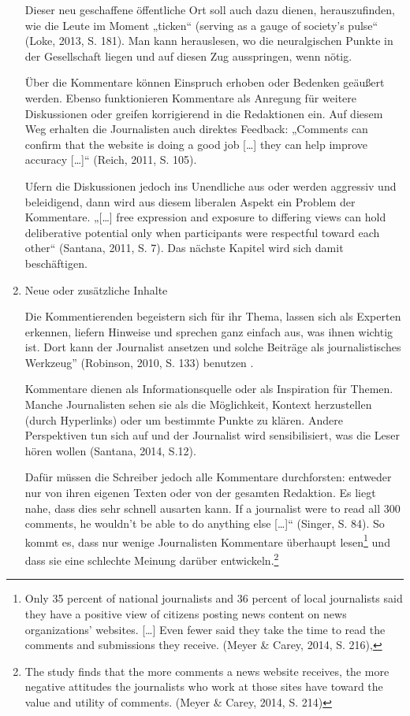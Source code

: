 \begin{enumerate}
Dieser neu geschaffene öffentliche Ort soll auch dazu dienen, herauszufinden,
wie die Leute im Moment „ticken“ (\glqq serving as a gauge of society’s pulse“ (Loke,
2013, S. 181). Man kann herauslesen, wo die neuralgischen Punkte in der Gesellschaft liegen und
auf diesen Zug ausspringen, wenn nötig.



Über die Kommentare können Einspruch erhoben oder Bedenken geäußert werden.
Ebenso funktionieren Kommentare als Anregung für weitere Diskussionen oder
greifen korrigierend  in die Redaktionen ein. Auf diesem Weg erhalten die
Journalisten auch direktes Feedback: „Comments can confirm that the website is
doing a good job [\ldots] they can help improve accuracy [\ldots]“ (Reich, 2011,
S. 105).

Ufern die Diskussionen jedoch ins Unendliche aus oder werden aggressiv und
beleidigend, dann wird aus diesem liberalen Aspekt ein Problem der Kommentare.
„[\ldots] free expression and exposure to differing views can hold deliberative
potential only when participants were respectful toward each other“ (Santana,
2011, S. 7). Das nächste Kapitel wird sich damit beschäftigen.


\item{Neue oder zusätzliche Inhalte}

Die Kommentierenden begeistern sich für ihr Thema, lassen sich als Experten
erkennen, liefern Hinweise und sprechen ganz einfach aus, was ihnen wichtig ist.
Dort kann der Journalist ansetzen und solche Beiträge als \glqq journalistisches Werkzeug'' 
(Robinson, 2010, S. 133) benutzen .

Kommentare dienen als Informationsquelle oder als Inspiration für Themen.
Manche Journalisten sehen sie als die Möglichkeit, Kontext herzustellen (durch Hyperlinks) 
oder um bestimmte Punkte zu klären. 
Andere Perspektiven tun sich auf und der Journalist wird sensibilisiert, was die
Leser hören wollen (Santana, 2014, S.12).

Dafür müssen die Schreiber jedoch alle Kommentare durchforsten: entweder nur von
ihren eigenen Texten oder von der gesamten Redaktion. Es liegt nahe, dass dies
sehr schnell ausarten kann. \glqq If a journalist were to read all 300 comments, he
wouldn’t be able to do anything else [\ldots]“ (Singer, S. 84). 
So kommt es, dass nur wenige Journalisten Kommentare überhaupt lesen\footnote{Only 35
percent of national journalists and 36 percent of local journalists said
they have a positive view of citizens posting news content on news
organizations’ websites. [\ldots] Even fewer said they take the time to read the
comments and submissions they receive. (Meyer \& Carey, 2014, S. 216)‚}
und dass sie eine schlechte Meinung darüber entwickeln.\footnote{The study
finds that the more comments a news website receives, the more negative
attitudes the journalists who work at those sites have toward the value and
utility of comments. (Meyer \& Carey, 2014, S. 214)}



\end{enumerate}
